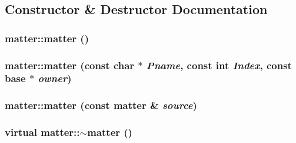 \subsection{Constructor \& Destructor Documentation}
\hypertarget{classmatter_aadaebd447a949f40f20753ae3b6163a1}{
\subsubsection[{matter}]{\setlength{\rightskip}{0pt plus 5cm}matter::matter ()}}
\label{classmatter_aadaebd447a949f40f20753ae3b6163a1}
\hypertarget{classmatter_acb99722e3f542cfcdcc658e1276f9027}{
\subsubsection[{matter}]{\setlength{\rightskip}{0pt plus 5cm}matter::matter (const char $\ast$ {\em Pname}, \/  const int {\em Index}, \/  const {\bf base} $\ast$ {\em owner})}}
\label{classmatter_acb99722e3f542cfcdcc658e1276f9027}
\hypertarget{classmatter_a0b5df9f5426e3b2fc39b3cf1fa220b11}{
\subsubsection[{matter}]{\setlength{\rightskip}{0pt plus 5cm}matter::matter (const {\bf matter} \& {\em source})}}
\label{classmatter_a0b5df9f5426e3b2fc39b3cf1fa220b11}
\hypertarget{classmatter_aa3c8c1d5f9fd9db9dba4afb72acd94a1}{
\subsubsection[{$\sim$matter}]{\setlength{\rightskip}{0pt plus 5cm}virtual matter::$\sim$matter ()}}
\label{classmatter_aa3c8c1d5f9fd9db9dba4afb72acd94a1}


